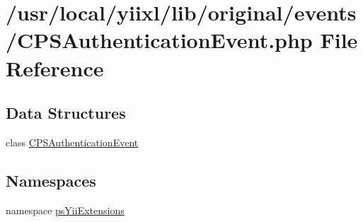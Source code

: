 \hypertarget{CPSAuthenticationEvent_8php}{
\section{/usr/local/yiixl/lib/original/events/CPSAuthenticationEvent.php File Reference}
\label{CPSAuthenticationEvent_8php}
}
\subsection*{Data Structures}
\begin{DoxyCompactItemize}
\item 
class \hyperlink{classCPSAuthenticationEvent}{CPSAuthenticationEvent}
\end{DoxyCompactItemize}
\subsection*{Namespaces}
\begin{DoxyCompactItemize}
\item 
namespace \hyperlink{namespacepsYiiExtensions}{psYiiExtensions}
\end{DoxyCompactItemize}
